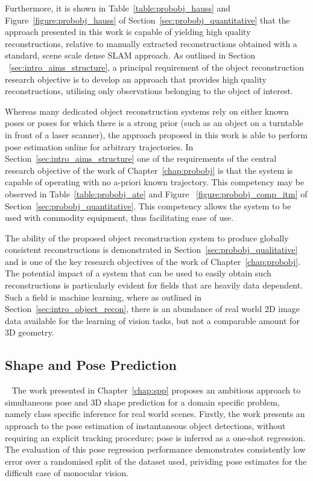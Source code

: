 Furthermore, it is shown in Table~\ref{table:probobj_hauss} and Figure~\ref{figure:probobj_hauss} 
of Section~\ref{sec:probobj_quantitative} that the approach presented in this work is capable of 
yielding high quality reconstructions, relative to manually extracted reconstructions obtained 
with a standard, scene scale dense SLAM approach. As outlined in Section
~\ref{sec:intro_aims_structure}, a principal requirement of the object reconstruction research 
objective is to develop an approach that provides high quality reconstructions, utilising only 
observations belonging to the object of interest.

Whereas many dedicated object reconstruction systems rely on either known poses or poses for which 
there is a strong prior (such as an object on a turntable in front of a laser scanner), the approach 
proposed in this work is able to perform pose estimation online for arbitrary trajectories. In 
Section~\ref{sec:intro_aims_structure} one of the requirements of the central research objective of 
the work of Chapter~\ref{chap:probobj} is that the system is capable of operating with no a-priori
known trajectory. This competency may be observed in Table~\ref{table:probobj_ate} and Figure
~\ref{figure:probobj_comp_itm} of Section~\ref{sec:probobj_quantitative}. This competency allows 
the system to be used with commodity equipment, thus facilitating ease of use.

The ability of the proposed object reconstruction system to produce globally consistent reconstructions 
is demonstrated in Section~\ref{sec:probobj_qualitative} and is one of the key research objectives of the 
work of Chapter~\ref{chap:probobj}. The potential impact of a system that can be used to easily obtain such 
reconstructions is particularly evident for fields that are heavily data dependent. Such a field is machine 
learning, where as outlined in Section~\ref{sec:intro_object_recon}, there is an abundance of real world 2D 
image data available for the learning of vision tasks, but not a comparable amount for 3D geometry.

\subsection{Shape and Pose Prediction}
~\label{subsec:discussion_spp}
The work presented in Chapter~\ref{chap:spp} proposes an ambitious approach to simultaneous pose and 
3D shape prediction for a domain specific problem, namely class specific inference for real world scenes. 
Firstly, the work presents an approach to the pose estimation of instantaneous object detections, without 
requiring an explicit tracking procedure; pose is inferred as a one-shot regression. The evaluation of this 
pose regression performance demonstrates consistently low error over a randomised split of the dataset used, 
prividing pose estimates for the difficult case of monocular vision.


